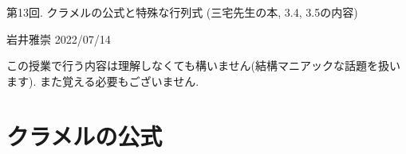 \documentclass[dvipdfmx,a4paper,11pt]{article}
\theoremstyle{definition}
\begin{document}
\begin{center}
{\Large 第13回. クラメルの公式と特殊な行列式 (三宅先生の本, 3.4, 3.5の内容)} 
\end{center}

\begin{flushright}
 岩井雅崇 2022/07/14
\end{flushright}

この授業で行う内容は理解しなくても構いません(結構マニアックな話題を扱います). 
また覚える必要もございません. 
\section{クラメルの公式}
\end{document}
